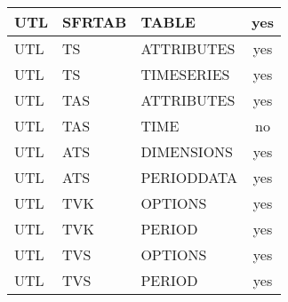 \begin{longtable}{p{1.5cm} p{1.5cm} p{3cm} c}
UTL & SFRTAB & TABLE & yes \\ 
\hline
UTL & TS & ATTRIBUTES & yes \\ 
UTL & TS & TIMESERIES & yes \\ 
\hline
UTL & TAS & ATTRIBUTES & yes \\ 
UTL & TAS & TIME & no \\ 
\hline
UTL & ATS & DIMENSIONS & yes \\ 
UTL & ATS & PERIODDATA & yes \\ 
\hline
UTL & TVK & OPTIONS & yes \\ 
UTL & TVK & PERIOD & yes \\ 
\hline
UTL & TVS & OPTIONS & yes \\ 
UTL & TVS & PERIOD & yes \\ 


\hline
\end{longtable}
\label{table:blocks}
\normalsize
